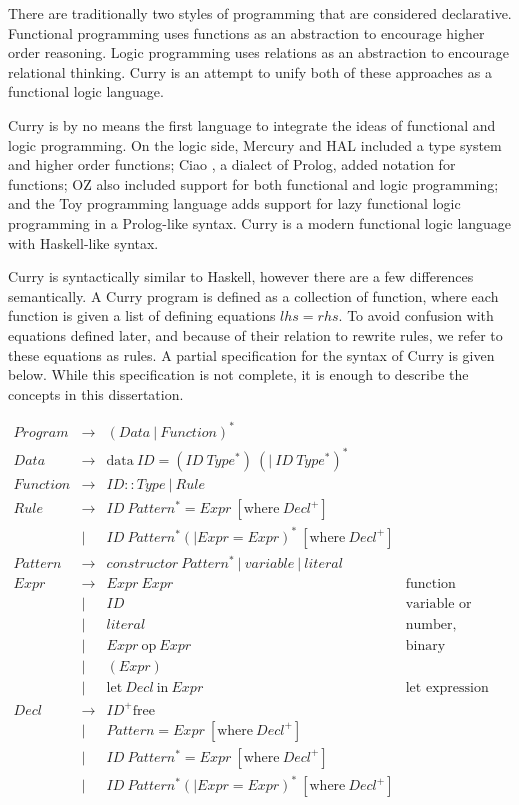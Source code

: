 
There are traditionally two styles of programming that are considered declarative.
Functional programming uses functions as an abstraction to encourage higher order reasoning.
Logic programming uses relations as an abstraction to encourage relational thinking.
Curry is an attempt to unify both of these approaches as a functional logic language.

Curry is by no means the first language to integrate the ideas of functional and logic programming.
On the logic side, Mercury \cite{mercury} and HAL \cite{hal} included a type system and higher order functions;
Ciao \cite{caio}, a dialect of Prolog, added notation for functions;
OZ \cite{oz} also included support for both functional and logic programming;
and the Toy programming language \cite{toy} adds support for lazy functional logic programming in a Prolog-like syntax.
Curry \cite{Hanus16Curry} is a modern functional logic language with Haskell-like syntax.

Curry is syntactically similar to Haskell, however there are a few differences semantically.
A Curry program is defined as a collection of function, where each function is given a list of defining equations $lhs = rhs$.
To avoid confusion with equations defined later, and because of their relation to rewrite rules, we refer to these equations as rules.
A partial specification for the syntax of Curry is given below.
While this specification is not complete, it is enough to describe the concepts in this dissertation.

$$\begin{array}{llll}
Program  & \to & (Data\ |\ Function)^* \\
Data     & \to & \text{data}\ ID = (ID\ Type^*)\ (|\ ID\ Type^*)^* \\
Function & \to & ID :: Type\ |\ Rule  \\
Rule     & \to & ID\ Pattern^* = Expr\ [\text{where}\ Decl^+] \\
         & |   & ID\ Pattern^* (| Expr = Expr )^*\ [\text{where}\ Decl^+] \\
Pattern  & \to & constructor\ Pattern^*\ |\ variable\ |\ literal \\
Expr     & \to & Expr\ Expr             & \text{function application}\\
         & |   & ID                     & \text{variable or function}\\
         & |   & literal                & \text{number, boolean, or character}\\
         & |   & Expr\ \text{op}\ Expr  & \text{binary operation}\\
         & |   & ( Expr )               & \\
         & |   & \text{let}\ Decl\ \text{in}\ Expr  & \text{let expression} \\
Decl     & \to & ID^+ \text{free} & \\
         & |   & Pattern = Expr\ [\text{where}\ Decl^+] & \\
         & |   & ID\ Pattern^* = Expr\ [\text{where}\ Decl^+] & \\
         & |   & ID\ Pattern^* (| Expr = Expr )^*\ [\text{where}\ Decl^+] &
\end{array}$$

